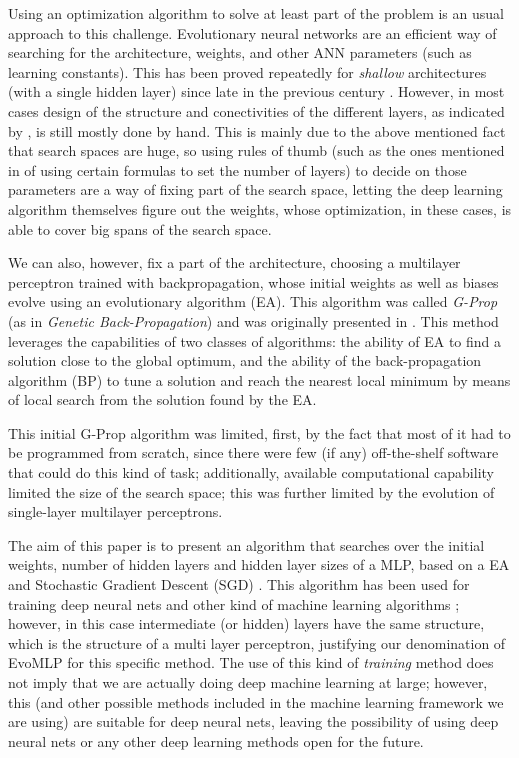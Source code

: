 \documentclass[runningheads]{llncs}
\begin{document}
Using an optimization algorithm to solve at least part of the problem
is an usual approach to this challenge. Evolutionary neural networks are an efficient way of searching for the
architecture, weights, and other ANN parameters (such as learning
constants). This has been proved
repeatedly for {\em shallow} architectures (with a single hidden
layer) since late in the previous century
\cite{yao1993evolutionary,CastilloNPL,stanley2002evolving}. However, in most cases design
of the structure and conectivities of the different layers, as
indicated by \cite{miikkulainen2019evolving}, is still mostly done by
hand. This is mainly due to the above mentioned fact that search
spaces are huge, so using rules of thumb (such as the ones mentioned
in \cite{qolomany2017parameters} of using certain formulas to set the
number of layers) to decide on those parameters
are a way of fixing part of the search space, letting the deep
learning algorithm themselves figure out the weights, whose
optimization, in these cases, is able to cover big spans of the search
space.

We can also, however, fix a part of the architecture, choosing a
multilayer perceptron trained with backpropagation, whose initial
weights as well as biases evolve using an evolutionary algorithm (EA). This
algorithm was called \emph{G-Prop} (as in \emph{Genetic Back-Propagation})
and was originally presented in \cite{castilloNC,CastilloNPL}. This
method leverages the capabilities of two classes of algorithms: the
ability of EA to find a solution close to the global optimum, and the
ability of the back-propagation algorithm (BP) \cite{Rumelhart86} to tune a solution and
reach the nearest local minimum by means of local search from the
solution found by the EA.

This initial G-Prop algorithm was limited, first, by the fact that
most of it had to be programmed from scratch, since there were few (if
any) off-the-shelf software that could do this kind of task;
additionally, available computational capability limited the size of
the search space;
this was further limited by the evolution of single-layer multilayer perceptrons.

The aim of this paper is to present an algorithm that searches over the initial weights, number of
hidden layers and hidden layer sizes of a MLP, based on a EA and
Stochastic Gradient Descent (SGD) \cite{bottou2012stochastic}. This
algorithm has been used for training deep neural nets and other kind
of machine learning algorithms
\cite{bottou2012stochastic,bottou2010large}; however, in this case
intermediate (or hidden) layers have the same structure,
which is the structure of a multi layer perceptron, justifying our
denomination of {\sf EvoMLP} for this specific method.
The use of this kind of {\em training} method does not imply that we
are actually doing deep machine learning at large; however, this (and
other possible methods included in the machine learning framework we
are using) are suitable for deep neural nets,
leaving the possibility of using deep neural nets or any other
deep learning methods open for the future.
\end{document}
